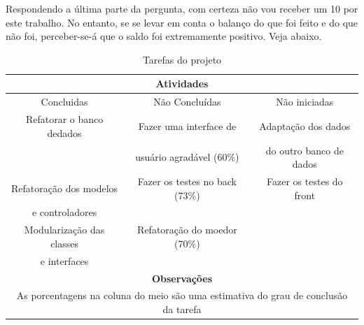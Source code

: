 Respondendo a última parte da pergunta, com certeza não vou receber um 10 por este trabalho. No entanto, se se levar
em conta o balanço do que foi feito e do que não foi, perceber-se-á que o saldo foi extremamente positivo. Veja abaixo.

\begin{table}[h]
    \centering
    \begin{tabular}{|c|c|c|}
        \hline
        \multicolumn{3}{|c|}{Atividades} \\ \hline\hline
        Concluidas & Não Concluídas & Não iniciadas \\ \hline
        Refatorar o banco dedados & Fazer uma interface de  & Adaptação dos dados \\
        & usuário agradável (60\%) & do outro banco de dados \\ \hline
        Refatoração dos modelos  & Fazer os testes no back (73\%) & Fazer os testes do front \\
        e controladores & & \\ \hline
        Modularização das classes & Refatoração do moedor (70\%) & \\
        e interfaces  & & \\ \hline\hline
        \multicolumn{3}{|c|}{\textbf{Observações}} \\ \hline
        \multicolumn{3}{|c|}{As porcentagens na coluna do meio são uma estimativa do grau de conclusão da tarefa} \\ \hline
    \end{tabular}
    \caption{Tarefas do projeto}
    \label{table:activity}
\end{table}